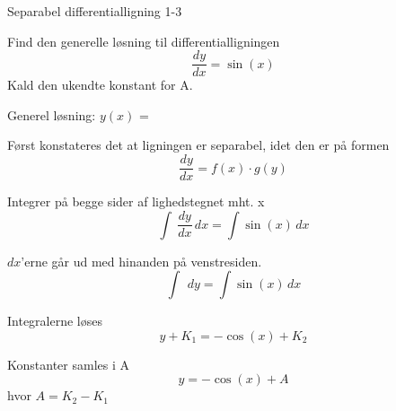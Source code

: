 \documentclass{article}
\begin{document}
\newpage

\begin{exercise}{Separabel differentialligning 1-3}


Find den generelle løsning til differentialligningen
\[
\frac{dy}{dx} = \sin(x)
\]
Kald den ukendte konstant for A.

Generel løsning: $y(x)$ = 

\hint

Først konstateres det at ligningen er separabel, idet den er på formen
\[
\frac{dy}{dx} = f(x) \cdot g(y)
\]

\hint

Integrer på begge sider af lighedstegnet mht. x
\[
\int\ \frac{dy}{dx}\, dx= \int \sin (x)\,dx
\]

\hint

$dx$'erne går ud med hinanden på venstresiden.
\[
\int\ \, dy= \int \sin(x)\,dx
\]

\hint

Integralerne løses
\[
y + K_1 =- \cos (x) + K_2
\]


\hint

Konstanter samles i A
\[
y = - \cos(x) + A
\]
hvor $A=K_2 - K_1$

\end{exercise}


\newpage
\end{document}
